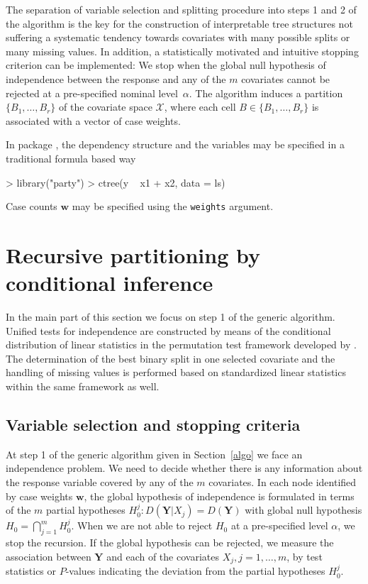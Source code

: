 \documentclass{Z}
\newcommand{\Y}{\mathbf{Y}}
\newcommand{\sX}{\mathcal{X}}
\newcommand{\w}{\mathbf{w}}
\begin{document}
The separation of variable
selection and splitting procedure into steps 1 and 2 of the algorithm
is the key for the construction of interpretable tree
structures not suffering a systematic tendency towards covariates with many
possible splits or many missing values. In addition, a statistically
motivated and intuitive stopping criterion can be implemented: We stop 
when the global null hypothesis of independence between the
response and any of the $m$ covariates cannot be rejected at a pre-specified
nominal level~$\alpha$. The algorithm induces a partition $\{B_1, \dots, B_r\}$ of
the covariate space $\sX$, where each cell $B \in \{B_1, \dots, B_r\}$ 
is associated with a vector of case weights. 

In package , the dependency structure and the variables may be
specified in a traditional formula based way
\begin{Schunk}
\begin{Sinput}
> library("party")
> ctree(y ~ x1 + x2, data = ls)
\end{Sinput}
\end{Schunk}
Case counts $\w$ may be specified using the \texttt{weights} argument.

\clearpage

\section{Recursive partitioning by conditional inference} \label{framework}

In the main part of this section we focus on step 1 of the generic algorithm.
Unified tests for independence are constructed by means of the conditional
distribution of linear statistics in the permutation test framework
developed by \cite{StrasserWeber1999}. The determination of the best binary split
in one selected covariate and the handling of missing values
is performed based on standardized linear statistics within the same
framework as well. 

\subsection{Variable selection and stopping criteria}

At step 1 of the generic algorithm given in Section~\ref{algo} we face an 
independence problem. We need to decide whether there is any information
about the response variable covered by any of the $m$  covariates. In each node
identified by case weights $\w$, the
global hypothesis of independence is formulated in terms of the $m$ partial hypotheses
$H_0^j: D(\Y | X_j) = D(\Y)$ with global null hypothesis $H_0 = \bigcap_{j = 1}^m
H_0^j$.
When we are not able to reject $H_0$ at a pre-specified 
level $\alpha$, we stop the recursion.
If the global hypothesis can be rejected, we measure the association
between $\Y$ and each of the covariates $X_j, j = 1, \dots, m$, by
test statistics or $P$-values indicating the deviation from the partial
hypotheses $H_0^j$.  
\end{document}
